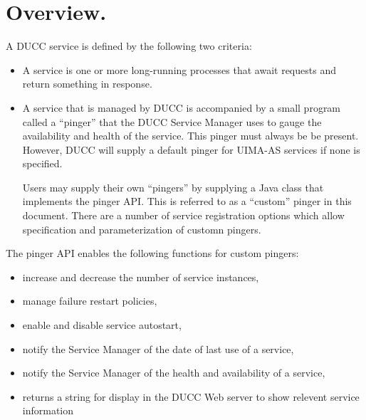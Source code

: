 % 
% 
% 
% 

      \section{Overview.} 
      A DUCC service is defined by the following two criteria:
      \begin{itemize}
          \item A service is one or more long-running processes that await requests
            and return something in response. 
          \item A service that is managed by DUCC is accompanied by a small program called a
            ``pinger'' that the DUCC Service Manager uses to gauge the availability and health of
            the service.  This pinger must always be be present. However, DUCC will supply a default
            pinger for UIMA-AS services if none is specified.
            
            Users may supply their own ``pingers'' by supplying a Java class that implements
            the pinger API.  This is referred to as a ``custom'' pinger in this document. 
            There are a number of service registration options which  allow
            specification and parameterization of customn pingers.

          \end{itemize}
      The pinger API enables the following functions for custom pingers:
      \begin{itemize}
      \item increase and decrease the number of service instances, 
      \item manage failure restart policies, 
      \item enable and disable service autostart, 
      \item notify the Service Manager of the date of last use of a service, 
      \item notify the Service Manager of the health and availability of a service, 
      \item returns a string for display in the DUCC Web server to show relevent service information
      \end{itemize}
      

